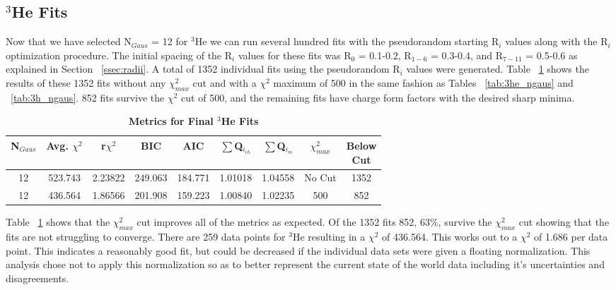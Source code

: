 \subsection{$^3$He Fits}
\label{ssec:3he_fits}

Now that we have selected N$_{Gaus}$ = 12 for $^3$He we can run several hundred fits with the pseudorandom starting R$_i$ values along with the R$_i$ optimization procedure. The initial spacing of the R$_i$ values for these fits was R$_0$ = 0.1-0.2, R$_{1-6}$ = 0.3-0.4, and R$_{7-11}$ = 0.5-0.6 as explained in Section ~\ref{ssec:radii}. A total of 1352 individual fits using the pseudorandom R$_i$ values were generated. Table ~\ref{tab:3he_fits} shows the results of these 1352 fits without any $\chi^2_{max}$ cut and with a $\chi^2$ maximum of 500 in the same fashion as Tables ~\ref{tab:3he_ngaus} and ~\ref{tab:3h_ngaus}. 852 fits survive the $\chi^2$ cut of 500, and the remaining fits have charge form factors with the desired sharp minima.

\begin{table}[!h]
\centering
\begin{tabular}{|c c c c c c c c c|}
\hline
\textbf{N$_{Gaus}$} & \textbf{Avg. $\chi^2$} & \textbf{r$\chi^2$} & \textbf{BIC} & \textbf{AIC} & \textbf{$\sum$Q$_{i_{ch}}$} & \textbf{$\sum$Q$_{i_{m}}$} & \textbf{$\chi^2_{max}$} & \makecell{\textbf{Below}\\ \textbf{Cut}} \\
\hline
12 & 523.743 & 2.23822 & 249.063 & 184.771 & 1.01018 & 1.04558 & No Cut & 1352\\
12 & 436.564 & 1.86566 & 201.908 & 159.223 & 1.00840 & 1.02235 & 500 & 852\\
\hline
\end{tabular}
\caption{\bf{Metrics for Final $^3$He Fits}}
\label{tab:3he_fits}
\end{table}

Table ~\ref{tab:3he_fits} shows that the $\chi^2_{max}$ cut improves all of the metrics as expected. Of the 1352 fits 852, 63$\%$, survive the $\chi^2_{max}$ cut showing that the fits are not struggling to converge. There are 259 data points for $^3$He resulting in a $\chi^2$ of 436.564. This works out to a $\chi^2$ of 1.686 per data point. This indicates a reasonably good fit, but could be decreased if the individual data sets were given a floating normalization. This analysis chose not to apply this normalization so as to better represent the current state of the world data including it's uncertainties and disagreements.

